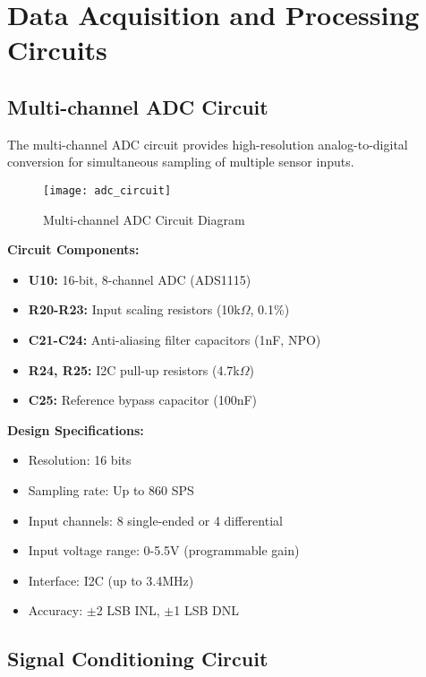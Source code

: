 \section{Data Acquisition and Processing Circuits}
\label{sec:data_acquisition_circuits}

\subsection{Multi-channel ADC Circuit}
\label{subsec:adc_circuit}

The multi-channel ADC circuit provides high-resolution analog-to-digital conversion for simultaneous sampling of multiple sensor inputs.

\begin{figure}[H]
\centering
\texttt{[image: adc\_circuit]}
\caption{Multi-channel ADC Circuit Diagram}
\label{fig:adc_circuit}
\end{figure}

\textbf{Circuit Components:}
\begin{itemize}
\item \textbf{U10:} 16-bit, 8-channel ADC (ADS1115)
\item \textbf{R20-R23:} Input scaling resistors (10k$\Omega$, 0.1\%)
\item \textbf{C21-C24:} Anti-aliasing filter capacitors (1nF, NPO)
\item \textbf{R24, R25:} I2C pull-up resistors (4.7k$\Omega$)
\item \textbf{C25:} Reference bypass capacitor (100nF)
\end{itemize}

\textbf{Design Specifications:}
\begin{itemize}
\item Resolution: 16 bits
\item Sampling rate: Up to 860 SPS
\item Input channels: 8 single-ended or 4 differential
\item Input voltage range: 0-5.5V (programmable gain)
\item Interface: I2C (up to 3.4MHz)
\item Accuracy: $\pm$2 LSB INL, $\pm$1 LSB DNL
\end{itemize}

\subsection{Signal Conditioning Circuit}
\label{subsec:signal_conditioning}

